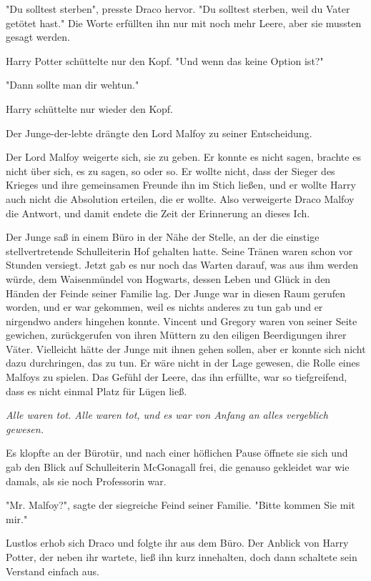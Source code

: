 {"Du solltest sterben", presste Draco hervor. "Du solltest sterben, weil du Vater getötet hast." Die Worte erfüllten ihn nur mit noch mehr Leere, aber sie mussten gesagt werden.

Harry Potter schüttelte nur den Kopf. "Und wenn das keine Option ist?"

"Dann sollte man dir wehtun."

Harry schüttelte nur wieder den Kopf.

Der Junge-der-lebte drängte den Lord Malfoy zu seiner Entscheidung.

Der Lord Malfoy weigerte sich, sie zu geben. Er konnte es nicht sagen, brachte es nicht über sich, es zu sagen, so oder so. Er wollte nicht, dass der Sieger des Krieges und ihre gemeinsamen Freunde ihn im Stich ließen, und er wollte Harry auch nicht die Absolution erteilen, die er wollte. Also verweigerte Draco Malfoy die Antwort, und damit endete die Zeit der Erinnerung an dieses Ich.

Der Junge saß in einem Büro in der Nähe der Stelle, an der die einstige stellvertretende Schulleiterin Hof gehalten hatte. Seine Tränen waren schon vor Stunden versiegt. Jetzt gab es nur noch das Warten darauf, was aus ihm werden würde, dem Waisenmündel von Hogwarts, dessen Leben und Glück in den Händen der Feinde seiner Familie lag. Der Junge war in diesen Raum gerufen worden, und er war gekommen, weil es nichts anderes zu tun gab und er nirgendwo anders hingehen konnte. Vincent und Gregory waren von seiner Seite gewichen, zurückgerufen von ihren Müttern zu den eiligen Beerdigungen ihrer Väter. Vielleicht hätte der Junge mit ihnen gehen sollen, aber er konnte sich nicht dazu durchringen, das zu tun. Er wäre nicht in der Lage gewesen, die Rolle eines Malfoys zu spielen. Das Gefühl der Leere, das ihn erfüllte, war so tiefgreifend, dass es nicht einmal Platz für Lügen ließ.

\emph{Alle waren tot. Alle waren tot, und es war von Anfang an alles vergeblich gewesen.}

Es klopfte an der Bürotür, und nach einer höflichen Pause öffnete sie sich und gab den Blick auf Schulleiterin McGonagall frei, die genauso gekleidet war wie damals, als sie noch Professorin war.

"Mr. Malfoy?", sagte der siegreiche Feind seiner Familie. "Bitte kommen Sie mit mir."

Lustlos erhob sich Draco und folgte ihr aus dem Büro. Der Anblick von Harry Potter, der neben ihr wartete, ließ ihn kurz innehalten, doch dann schaltete sein Verstand einfach aus.

}
